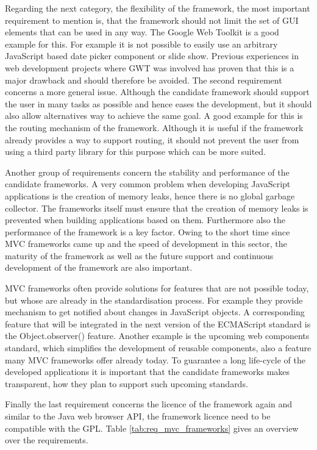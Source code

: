 Regarding the next category, the flexibility of the framework, the most important requirement to mention is, that the framework should not limit the set of GUI elements that can be used in any way.
The Google Web Toolkit \autocite{conception:gwt} is a good example for this.
For example it is not possible to easily use an arbitrary JavaScript based date picker component or slide show.
Previous experiences in web development projects where GWT was involved has proven that this is a major drawback and should therefore be avoided.
The second requirement concerns a more general issue.
Although the candidate framework should support the user in many tasks as possible and hence eases the development, but it should also allow alternatives way to achieve the same goal.
A good example for this is the routing mechanism of the framework.
Although it is useful if the framework already provides a way to support routing, it should not prevent the user from using a third party library for this purpose which can be more suited.

Another group of requirements concern the stability and performance of the candidate frameworks.
A very common problem when developing JavaScript applications is the creation of memory leaks, hence there is no global garbage collector.
The frameworks itself must ensure that the creation of memory leaks is prevented when building applications based on them.
Furthermore also the performance of the framework is a key factor.
Owing to the short time since MVC frameworks came up and the speed of development in this sector, the maturity of the framework as well as the future support and continuous development of the framework are also important.

MVC frameworks often provide solutions for features that are not possible today, but whose are already in the standardisation process.
For example they provide mechanism to get notified about changes in JavaScript objects.
A corresponding feature that will be integrated in the next version of the ECMAScript standard is the Object.observer() feature.
Another example is the upcoming web components standard, which simplifies the development of reusable components, also a feature many MVC frameworks offer already today.
To guarantee a long life-cycle of the developed applications it is important that the candidate frameworks makes transparent, how they plan to support such upcoming standards.
 
Finally the last requirement concerns the licence of the framework again and similar to the Java web browser API, the framework licence need to be compatible with the GPL.
Table \ref{tab:req_mvc_frameworks} gives an overview over the requirements.\\

